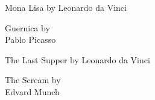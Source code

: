 \begin{figure*}[h]
\centering
\footnotesize
\begin{minipage}[t]{0.98\figwidth}
    \vspace{0pt}
    \begin{minipage}[t]{0.25\columnwidth}
        \centering
        Mona Lisa by Leonardo da Vinci
    \end{minipage}%
    \begin{minipage}[t]{0.25\columnwidth}
        \centering
        Guernica by\\Pablo Picasso
    \end{minipage}%
    \begin{minipage}[t]{0.25\columnwidth}
        \centering
        The Last Supper by Leonardo da Vinci
    \end{minipage}%
    \begin{minipage}[t]{0.25\columnwidth}
        \centering
        The Scream by\\Edvard Munch
    \end{minipage}%
\end{minipage}



\end{figure*}
